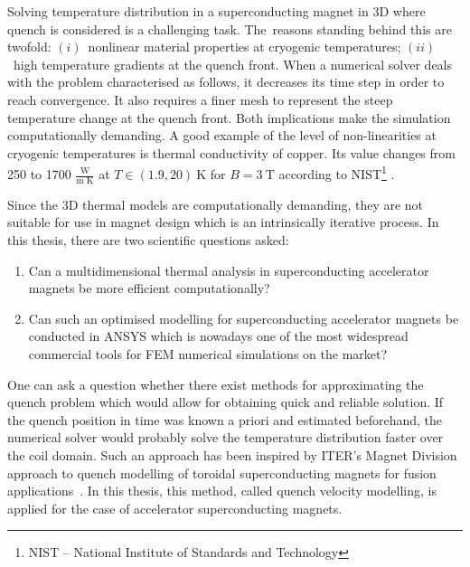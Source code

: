 
Solving temperature distribution in a superconducting magnet in 3D where quench is considered is a challenging task. The~reasons standing behind this are twofold: $(i)$~nonlinear material properties at cryogenic temperatures; $(ii)$~high temperature gradients at the quench front. When a numerical solver deals with the problem characterised as follows, it decreases its time step in order to reach convergence. It also requires a finer mesh to represent the steep temperature change at the quench front. Both implications make the simulation computationally demanding. A good example of the level of non-linearities at cryogenic temperatures is thermal conductivity of copper. Its value changes from 250 to 1700 $\frac{\text{W}}{\text{m K}}$ at $T \in (1.9, 20)~\text{K}$ for $B=3~\text{T}$ according to NIST\footnote{NIST -- National Institute of Standards and Technology} \cite{material_properties_roxie}.

Since the 3D thermal models are computationally demanding, they are not suitable for use in magnet design which is an intrinsically iterative process. In this thesis, there are two scientific questions asked:

\begin{enumerate}
\item Can a multidimensional thermal analysis in superconducting accelerator magnets be more efficient computationally?
\item  Can such an optimised modelling for superconducting accelerator magnets be conducted in ANSYS which is nowadays one of the most widespread commercial tools for FEM numerical simulations on the market?
\end{enumerate}

One can ask a question whether there exist methods for approximating the quench problem which would allow for obtaining quick and reliable solution. If the quench position in time was known a priori and estimated beforehand, the numerical solver would probably solve the temperature distribution faster over the coil domain. Such an approach has been inspired by ITER's Magnet Division approach to quench modelling of toroidal superconducting magnets for fusion applications~\cite{iter_presentation_qualified_analysis, iter_fault_case_study}. In this thesis, this method, called quench velocity modelling, is applied for the case of accelerator superconducting magnets. 
